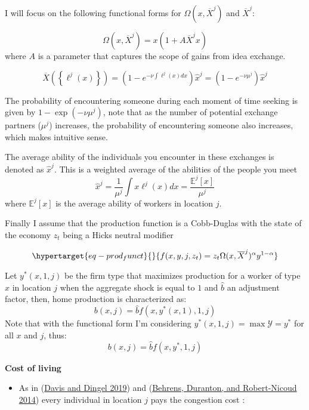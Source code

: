 \documentclass[
  letterpaper,
  DIV=11,
  numbers=noendperiod]{scrreprt}
\providecommand{\tightlist}{%
  \setlength{\itemsep}{0pt}\setlength{\parskip}{0pt}}\usepackage{longtable,booktabs,array}
\begin{document}
I will focus on the following functional forms for
\(\Omega(x, \overline{X}^j)\) and \(\overline{X}^j\):

\[\Omega(x, \overline{X}^j) = x(1 + A \overline{X}^j x)\] where \(A\) is
a parameter that captures the scope of gains from idea exchange.

\[
    \overline{X}\left(\left\{\ell^j(x)\right\}\right) = \left(1 - e^{-\nu \int \ell^j(x) dx}\right)\hat{x}^j =\left(1 - e^{-\nu \mu^j} \right)\hat{x}^j
\]

The probability of encountering someone during each moment of time
seeking is given by \(1 - \exp(-ν \mu^j)\), note that as the number of
potential exchange partners (\(\mu^j\)) increases, the probability of
encountering someone also increases, which makes intuitive sense.

The average ability of the individuals you encounter in these exchanges
is denoted as \(\hat{x}^j\). This is a weighted average of the abilities
of the people you meet
\[\hat{x}^j = \frac{1}{\mu^j}\int{x\ell^j(x)dx}=\frac{\mathbb{E}^j[x]}{\mu^j}\]
where \(\mathbb{E}^j[x]\) is the average ability of workers in location
\(j\).

Finally I assume that the production function is a Cobb-Duglas with the
state of the economy \(z_t\) being a Hicks neutral modifier

\begin{equation}\protect\hypertarget{eq-prod_funct}{}{
f(x,y,j,z_t) = z_t \Omega(x,\overline{X}^j)^\alpha y^{1-\alpha}
}\label{eq-prod_funct}\end{equation}

Let \(y^*(x,1, j)\) be the firm type that maximizes production for a
worker of type \(x\) in location \(j\) when the aggregate shock is equal
to \(1\) and \(\hat{b}\) an adjustment factor, then, home production is
characterized as:\\
\[
b(x, j) = \hat{b} f(x,y^*(x,1),1, j)\] Note that with the functional
form I'm considering \(y^{*}(x,1,j) = \max{\mathcal{Y}}=y^{*}\) for all
\(x\) and \(j\), thus: \[b(x, j) = \hat{b} f(x,y^*,1, j)\]

\textbf{Cost of living}

\begin{itemize}
\tightlist
\item
  As in (\protect\hyperlink{ref-davisSpatialKnowledgeEconomy2019}{Davis
  and Dingel 2019}) and
  (\protect\hyperlink{ref-behrensProductiveCitiesSorting2014a}{Behrens,
  Duranton, and Robert-Nicoud 2014}) every individual in location \(j\)
  pays the congestion cost :
\end{itemize}
\end{document}
